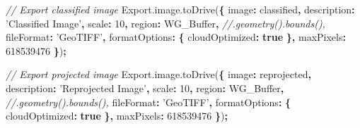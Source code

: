 \documentclass[]{article}
\newenvironment{Shaded}{\begin{snugshade}}{\end{snugshade}}
\newcommand{\AttributeTok}[1]{\textcolor[rgb]{0.77,0.63,0.00}{#1}}
\newcommand{\CommentTok}[1]{\textcolor[rgb]{0.56,0.35,0.01}{\textit{#1}}}
\newcommand{\DataTypeTok}[1]{\textcolor[rgb]{0.13,0.29,0.53}{#1}}
\newcommand{\DecValTok}[1]{\textcolor[rgb]{0.00,0.00,0.81}{#1}}
\newcommand{\KeywordTok}[1]{\textcolor[rgb]{0.13,0.29,0.53}{\textbf{#1}}}
\newcommand{\NormalTok}[1]{#1}
\newcommand{\OperatorTok}[1]{\textcolor[rgb]{0.81,0.36,0.00}{\textbf{#1}}}
\newcommand{\StringTok}[1]{\textcolor[rgb]{0.31,0.60,0.02}{#1}}
\newcommand{\VariableTok}[1]{\textcolor[rgb]{0.00,0.00,0.00}{#1}}
\begin{document}
\begin{Shaded}
\begin{Highlighting}[numbers=left,,]
\CommentTok{// Export classified image}
\VariableTok{Export}\NormalTok{.}\VariableTok{image}\NormalTok{.}\AttributeTok{toDrive}\NormalTok{(}\OperatorTok{\{}
  \DataTypeTok{image}\OperatorTok{:}\NormalTok{ classified}\OperatorTok{,}
  \DataTypeTok{description}\OperatorTok{:} \StringTok{'Classified Image'}\OperatorTok{,}
  \DataTypeTok{scale}\OperatorTok{:} \DecValTok{10}\OperatorTok{,}
  \DataTypeTok{region}\OperatorTok{:}\NormalTok{ WG_Buffer}\OperatorTok{,}      \CommentTok{//.geometry().bounds(),}
  \DataTypeTok{fileFormat}\OperatorTok{:} \StringTok{'GeoTIFF'}\OperatorTok{,}
  \DataTypeTok{formatOptions}\OperatorTok{:} \OperatorTok{\{}
    \DataTypeTok{cloudOptimized}\OperatorTok{:} \KeywordTok{true}
  \OperatorTok{\},}
  \DataTypeTok{maxPixels}\OperatorTok{:} \DecValTok{618539476}
\OperatorTok{\}}\NormalTok{)}\OperatorTok{;}

\CommentTok{// Export projected image}
\VariableTok{Export}\NormalTok{.}\VariableTok{image}\NormalTok{.}\AttributeTok{toDrive}\NormalTok{(}\OperatorTok{\{}
  \DataTypeTok{image}\OperatorTok{:}\NormalTok{ reprojected}\OperatorTok{,}
  \DataTypeTok{description}\OperatorTok{:} \StringTok{'Reprojected Image'}\OperatorTok{,}
  \DataTypeTok{scale}\OperatorTok{:} \DecValTok{10}\OperatorTok{,}
  \DataTypeTok{region}\OperatorTok{:}\NormalTok{ WG_Buffer}\OperatorTok{,}         \CommentTok{//.geometry().bounds(),}
  \DataTypeTok{fileFormat}\OperatorTok{:} \StringTok{'GeoTIFF'}\OperatorTok{,}
  \DataTypeTok{formatOptions}\OperatorTok{:} \OperatorTok{\{}
    \DataTypeTok{cloudOptimized}\OperatorTok{:} \KeywordTok{true}
  \OperatorTok{\},}
  \DataTypeTok{maxPixels}\OperatorTok{:} \DecValTok{618539476}
\OperatorTok{\}}\NormalTok{)}\OperatorTok{;}
\end{Highlighting}
\end{Shaded}
\end{document}
